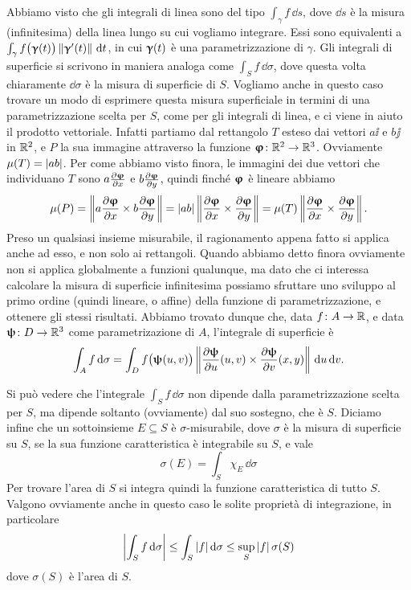 Abbiamo visto che gli integrali di linea sono del tipo $\int_\gamma f\,\dd s$, dove $\dd s$ è la misura (infinitesima) della linea lungo su cui vogliamo integrare.
Essi sono equivalenti a $\int_\gamma f\big(\bm{\upgamma}(t)\big)\left\|{\bm{\upgamma}'(t)}\right\|\,\textup{d} t$, in cui $\bm{\upgamma}(t)$ è una parametrizzazione di $\gamma$.
Gli integrali di superficie si scrivono in maniera analoga come $\int_S f\,\dd\sigma$, dove questa volta chiaramente $\dd\sigma$ è la misura di superficie di $S$.
Vogliamo anche in questo caso trovare un modo di esprimere questa misura superficiale in termini di una parametrizzazione scelta per $S$, come per gli integrali di linea, e ci viene in aiuto il prodotto vettoriale.
Infatti partiamo dal rettangolo $T$ esteso dai vettori $a\ii$ e $b\jj$ in $\mathbb{R}^2$, e $P$ la sua immagine attraverso la funzione $\bm{\upvarphi}\colon\mathbb{R}^2\to\mathbb{R}^3$.
Ovviamente $\mu(T)=\left|{ab}\right|$.
Per come abbiamo visto finora, le immagini dei due vettori che individuano $T$ sono $a\frac{\partial {\bm{\upvarphi}}}{\partial {x}}$ e $b\frac{\partial {\bm{\upvarphi}}}{\partial {y}}$, quindi finch\'e $\bm{\upvarphi}$ è lineare abbiamo
\begin{equation*}
	\mu(P)=\left\|{a\frac{\partial {\bm{\upvarphi}}}{\partial {x}}\times b\frac{\partial {\bm{\upvarphi}}}{\partial {y}}}\right\|=\left|{ab}\right|\left\|{\frac{\partial {\bm{\upvarphi}}}{\partial {x}}\times\frac{\partial {\bm{\upvarphi}}}{\partial {y}}}\right\|=\mu(T)\left\|{\frac{\partial {\bm{\upvarphi}}}{\partial {x}}\times\frac{\partial {\bm{\upvarphi}}}{\partial {y}}}\right\|.
\end{equation*}
Preso un qualsiasi insieme misurabile, il ragionamento appena fatto si applica anche ad esso, e non solo ai rettangoli.
Quando abbiamo detto finora ovviamente non si applica globalmente a funzioni qualunque, ma dato che ci interessa calcolare la misura di superficie infinitesima possiamo sfruttare uno sviluppo al primo ordine (quindi lineare, o affine) della funzione di parametrizzazione, e ottenere gli stessi risultati.
Abbiamo trovato dunque che, data $f\colon A\to\mathbb{R}$, e data $\bm{\uppsi}\colon D\to\mathbb{R}^3$ come parametrizazione di $A$, l'integrale di superficie è
\begin{equation}
	\int_Af\,\textup{d}\sigma=\int_Df\big(\bm{\uppsi}(u,v)\big)\left\|{\frac{\partial {\bm{\uppsi}}}{\partial {u}}(u,v)\times\frac{\partial {\bm{\uppsi}}}{\partial {v}}(x,y)}\right\|\,\textup{d} u\,\textup{d} v.
\end{equation}

Si può vedere che l'integrale $\int_Sf\,\dd\sigma$ non dipende dalla parametrizzazione scelta per $S$, ma dipende soltanto (ovviamente) dal suo sostegno, che è $S$.
Diciamo infine che un sottoinsieme $E\subseteq S$ è $\sigma$-misurabile, dove $\sigma$ è la misura di superficie su $S$, se la sua funzione caratteristica è integrabile su $S$, e vale
\begin{equation}
	\sigma(E)=\int_S\chi_E\,\dd\sigma
\end{equation}
Per trovare l'area di $S$ si integra quindi la funzione caratteristica di tutto $S$.
Valgono ovviamente anche in questo caso le solite proprietà di integrazione, in particolare
\begin{equation}
	\left|{\int_Sf\,\textup{d}\sigma}\right|\leq\int_S\left|{f}\right|\textup{d}\sigma\leq\sup_S\left|{f}\right|\sigma(S)
\end{equation}
dove $\sigma(S)$ è l'area di $S$.

